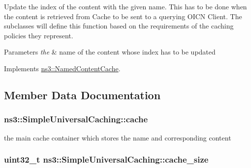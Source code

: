 Update the index of the content with the given name. This has to be done when the content is retrieved from Cache to be sent to a querying O\-I\-C\-N Client. The subclasses will define this function based on the requirements of the caching policies they represent. 


\begin{DoxyParams}{Parameters}
{\em the} & name of the content whose index has to be updated \\
\hline
\end{DoxyParams}


Implements \hyperlink{classns3_1_1NamedContentCache_aeabf8afacd89cbc46b78b382c8a487e8}{ns3\-::\-Named\-Content\-Cache}.



\subsection{Member Data Documentation}
\hypertarget{classns3_1_1SimpleUniversalCaching_aa6d19b19f2e287526b965cbb52c9f9e6}{
\subsubsection[{cache}]{ ns3\-::\-Simple\-Universal\-Caching\-::cache\hspace{0.3cm}{\ttfamily [private]}}}\label{classns3_1_1SimpleUniversalCaching_aa6d19b19f2e287526b965cbb52c9f9e6}


the main cache container which stores the name and corresponding content 

\hypertarget{classns3_1_1SimpleUniversalCaching_a7bad9b82148c85412f776cd8581dda51}{
\subsubsection[{cache\-\_\-size}]{\setlength{\rightskip}{0pt plus 5cm}uint32\-\_\-t ns3\-::\-Simple\-Universal\-Caching\-::cache\-\_\-size\hspace{0.3cm}{\ttfamily [private]}}}\label{classns3_1_1SimpleUniversalCaching_a7bad9b82148c85412f776cd8581dda51}


